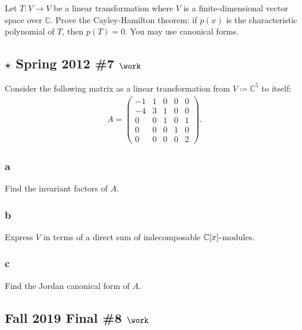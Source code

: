 Let \(T:V\to V\) be a linear transformation where \(V\) is a
finite-dimensional vector space over \({\mathbb{C}}\). Prove the
Cayley-Hamilton theorem: if \(p(x)\) is the characteristic polynomial of
\(T\), then \(p(T) = 0\). You may use canonical forms.

\hypertarget{star-spring-2012-7-work}{%
\subsection{\texorpdfstring{\(\star\) Spring 2012 \#7
\(\work\)}{\textbackslash star Spring 2012 \#7 \textbackslash work}}\label{star-spring-2012-7-work}}

Consider the following matrix as a linear transformation from
\(V\coloneqq{\mathbb{C}}^5\) to itself:
\begin{align*}
A=\left(\begin{array}{ccccc}
-1 & 1 & 0 & 0 & 0 \\
-4 & 3 & 1 & 0 & 0 \\
0 & 0 & 1 & 0 & 1 \\
0 & 0 & 0 & 1 & 0 \\
0 & 0 & 0 & 0 & 2
\end{array}\right)
.\end{align*}

\hypertarget{a-108}{%
\subsubsection{a}\label{a-108}}

Find the invariant factors of \(A\).

\hypertarget{b-98}{%
\subsubsection{b}\label{b-98}}

Express \(V\) in terms of a direct sum of indecomposable
\({\mathbb{C}}[x]{\hbox{-}}\)modules.

\hypertarget{c-59}{%
\subsubsection{c}\label{c-59}}

Find the Jordan canonical form of \(A\).

\hypertarget{fall-2019-final-8-work}{%
\subsection{\texorpdfstring{Fall 2019 Final \#8
\(\work\)}{Fall 2019 Final \#8 \textbackslash work}}\label{fall-2019-final-8-work}}

